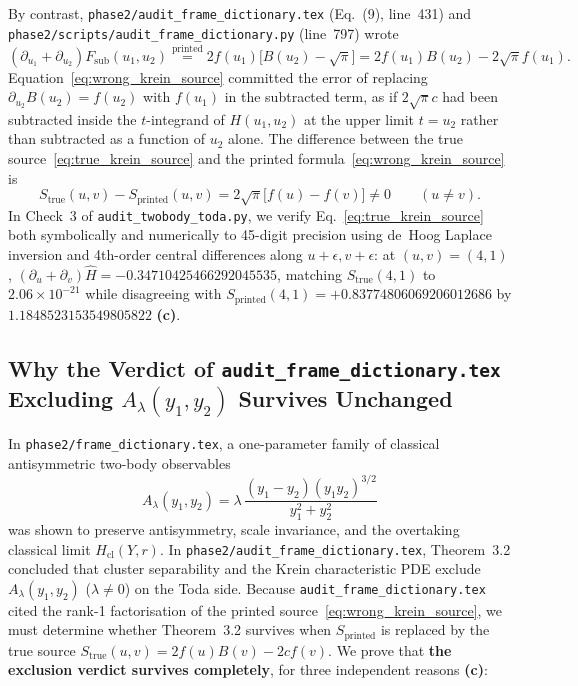 \documentclass[11pt,a4paper]{article}
\begin{document}
By contrast, \texttt{phase2/audit\_frame\_dictionary.tex} (Eq.~(9), line~431) and \texttt{phase2/scripts/audit\_frame\_dictionary.py} (line~797) wrote
\begin{equation}\label{eq:wrong_krein_source}
  (\partial_{u_1}+\partial_{u_2})F_{\mathrm{sub}}(u_1,u_2) \stackrel{\text{printed}}{=} 2f(u_1)\bigl[B(u_2)-\sqrt{\pi}\bigr] = 2f(u_1)B(u_2) - 2\sqrt{\pi}f(u_1).
\end{equation}
Equation~\eqref{eq:wrong_krein_source} committed the error of replacing $\partial_{u_2}B(u_2)=f(u_2)$ with $f(u_1)$ in the subtracted term, as if $2\sqrt{\pi}c$ had been subtracted inside the $t$-integrand of $H(u_1,u_2)$ at the upper limit $t=u_2$ rather than subtracted as a function of $u_2$ alone. The difference between the true source~\eqref{eq:true_krein_source} and the printed formula~\eqref{eq:wrong_krein_source} is
\begin{equation}
  S_{\mathrm{true}}(u,v) - S_{\mathrm{printed}}(u,v) = 2\sqrt{\pi}\bigl[f(u)-f(v)\bigr] \neq 0 \qquad (u\neq v).
\end{equation}
In Check~3 of \texttt{audit\_twobody\_toda.py}, we verify Eq.~\eqref{eq:true_krein_source} both symbolically and numerically to 45-digit precision using de~Hoog Laplace inversion and 4th-order central differences along $u+\epsilon, v+\epsilon$: at $(u,v)=(4,1)$, $(\partial_u+\partial_v)\widehat{H}=-0.34710425466292045535$, matching $S_{\mathrm{true}}(4,1)$ to $2.06\times 10^{-21}$ while disagreeing with $S_{\mathrm{printed}}(4,1)=+0.83774806069206012686$ by $1.1848523153549805822$ \textbf{(c)}.

\subsection{Why the Verdict of \texttt{audit\_frame\_dictionary.tex} Excluding \texorpdfstring{$A_\lambda(y_1,y_2)$}{A\_lambda(y1,y2)} Survives Unchanged}

In \texttt{phase2/frame\_dictionary.tex}, a one-parameter family of classical antisymmetric two-body observables
\begin{equation}\label{eq:A_lambda}
  A_\lambda(y_1,y_2) = \lambda\,\frac{(y_1-y_2)(y_1 y_2)^{3/2}}{y_1^2+y_2^2}
\end{equation}
was shown to preserve antisymmetry, scale invariance, and the overtaking classical limit $H_{\mathrm{cl}}(Y,r)$. In \texttt{phase2/audit\_frame\_dictionary.tex}, Theorem~3.2 concluded that cluster separability and the Krein characteristic PDE exclude $A_\lambda(y_1,y_2)$ ($\lambda\neq 0$) on the Toda side. Because \texttt{audit\_frame\_dictionary.tex} cited the rank-1 factorisation of the printed source~\eqref{eq:wrong_krein_source}, we must determine whether Theorem~3.2 survives when $S_{\mathrm{printed}}$ is replaced by the true source $S_{\mathrm{true}}(u,v)=2f(u)B(v)-2cf(v)$. We prove that \textbf{the exclusion verdict survives completely}, for three independent reasons \textbf{(c)}:
\end{document}
